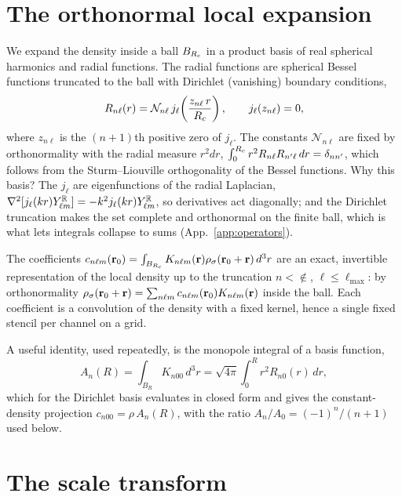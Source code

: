 
\section{The orthonormal local expansion}
\label{app:basis}

We expand the density inside a ball $B_{R_{c}}$ in a product basis of real spherical
harmonics and radial functions. The radial functions are spherical Bessel
functions truncated to the ball with Dirichlet (vanishing) boundary conditions,
\begin{equation}
R_{n\ell}(r)=\mathcal N_{n\ell}\,j_\ell\!\left(\frac{z_{n\ell}\,r}{R_{c}}\right),
\qquad j_\ell\!\left(z_{n\ell}\right)=0,
\end{equation}
where $z_{n\ell}$ is the $(n{+}1)$th positive zero of $j_\ell$. The constants
$\mathcal N_{n\ell}$ are fixed by orthonormality with the radial measure $r^2dr$,
$\int_0^{R_{c}} r^2 R_{n\ell}R_{n'\ell}\,dr=\delta_{nn'}$, which follows from the
Sturm--Liouville orthogonality of the Bessel functions. Why this basis? The
$j_\ell$ are eigenfunctions of the radial Laplacian,
$\nabla^2[j_\ell(kr)Y^{\mathbb{R}}_{\ell m}]=-k^2 j_\ell(kr)Y^{\mathbb{R}}_{\ell m}$, so derivatives act diagonally;
and the Dirichlet truncation makes the set complete
and orthonormal on the finite ball, which is what lets integrals collapse to sums
(App.~\ref{app:operators}).

The coefficients $c_{n\ell m}(\mathbf{r}_0)=\int_{B_{R_{c}}}K_{n\ell m}(\mathbf{r})
\rho_\sigma(\mathbf{r}_0+\mathbf{r})\,d^3r$ are an exact, invertible representation of the local
density up to the truncation $n<\nin$, $\ell\le\ell_{\max}$: by orthonormality
$\rho_\sigma(\mathbf{r}_0+\mathbf{r})=\sum_{n\ell m}c_{n\ell m}(\mathbf{r}_0)K_{n\ell m}(\mathbf{r})$ inside
the ball. Each coefficient is a convolution of the density with a fixed kernel,
hence a single fixed stencil per channel on a grid.

A useful identity, used repeatedly, is the monopole integral of a basis function,
\begin{equation}
\label{eq:An}
A_n(R)=\int_{B_R}K_{n00}\,d^3r=\sqrt{4\pi}\int_0^R r^2 R_{n0}(r)\,dr,
\end{equation}
which for the Dirichlet basis evaluates in closed form and gives the constant-density
projection $c_{n00}=\rho\,A_n(R)$, with the ratio $A_n/A_0=(-1)^n/(n+1)$ used below.

\section{The scale transform}
\label{app:scale}

